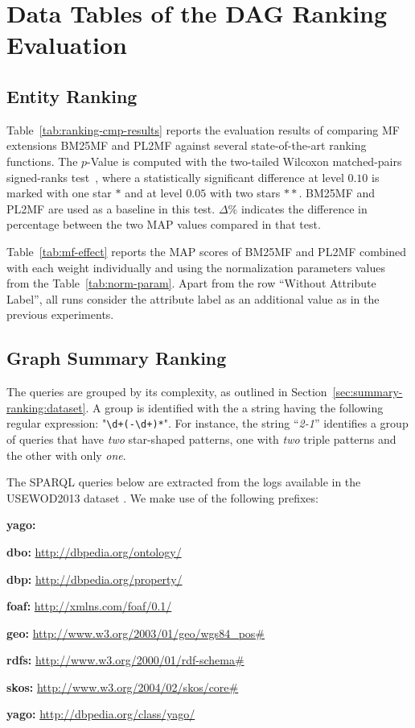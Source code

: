 \chapter{Data Tables of the DAG Ranking Evaluation}

\section{Entity Ranking}

Table~\ref{tab:ranking-cmp-results} reports the evaluation results of comparing MF extensions BM25MF and PL2MF against several state-of-the-art ranking functions. The $p$-Value is computed with the two-tailed Wilcoxon matched-pairs signed-ranks test~\cite{sheskin:2003:CRC,buttcher:2010:IRI:1869919}, where a statistically significant difference at level $0.10$ is marked with one star $*$ and at level $0.05$ with two stars $**$. BM25MF and PL2MF are used as a baseline in this test. $\Delta\%$ indicates the difference in percentage between the two MAP values compared in that test.




Table~\ref{tab:mf-effect} reports the MAP scores of BM25MF and PL2MF combined with each weight individually and using the normalization parameters values from the Table~\ref{tab:norm-param}. Apart from the row ``Without Attribute Label'', all runs consider the attribute label as an additional value as in the previous experiments.



\section{Graph Summary Ranking}
\label{app:summary-ranking}

The queries are grouped by its complexity, as outlined in Section~\ref{sec:summary-ranking:dataset}. A group is identified with the a string having the following regular expression: "\verb/\d+(-\d+)*/". For instance, the string ``\emph{2-1}'' identifies a group of queries that have \textit{two} star-shaped patterns, one with \textit{two} triple patterns and the other with only \textit{one}.

The SPARQL queries below are extracted from the logs available in the USEWOD2013 dataset \cite{usewod:2013}. We make use of the following prefixes:
\begin{labeling}{\textbf{yago:}}
	\item[\textbf{dbo:}] \url{http://dbpedia.org/ontology/}
	\item[\textbf{dbp:}] \url{http://dbpedia.org/property/}
	\item[\textbf{foaf:}] \url{http://xmlns.com/foaf/0.1/}
	\item[\textbf{geo:}] \url{http://www.w3.org/2003/01/geo/wgs84\_pos#}
	\item[\textbf{rdfs:}] \url{http://www.w3.org/2000/01/rdf-schema#}
	\item[\textbf{skos:}] \url{http://www.w3.org/2004/02/skos/core#}
	\item[\textbf{yago:}] \url{http://dbpedia.org/class/yago/}
\end{labeling}

